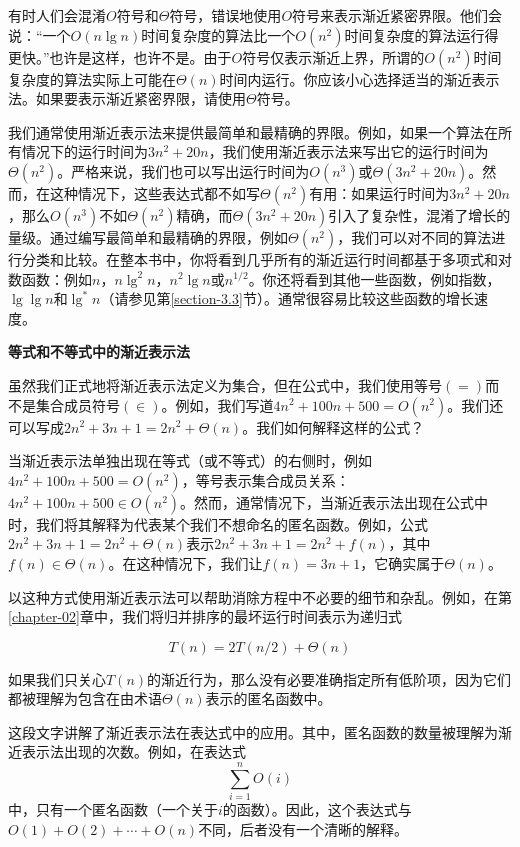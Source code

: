 \documentclass[lang=cn,newtx,10pt,scheme=chinese]{elegantbook}
\begin{document}
有时人们会混淆$O$符号和$\Theta$符号，错误地使用$O$符号来表示渐近紧密界限。他们会说：“一个$O(n\lg n)$时间复杂度的算法比一个$O\left(n^2\right)$时间复杂度的算法运行得更快。”也许是这样，也许不是。由于$O$符号仅表示渐近上界，所谓的$O\left(n^2\right)$时间复杂度的算法实际上可能在$\Theta(n)$时间内运行。你应该小心选择适当的渐近表示法。如果要表示渐近紧密界限，请使用$\Theta$符号。

我们通常使用渐近表示法来提供最简单和最精确的界限。例如，如果一个算法在所有情况下的运行时间为$3n^2+20n$，我们使用渐近表示法来写出它的运行时间为$\Theta\left(n^2\right)$。严格来说，我们也可以写出运行时间为$O\left(n^3\right)$或$\Theta\left(3n^2+20n\right)$。然而，在这种情况下，这些表达式都不如写$\Theta\left(n^2\right)$有用：如果运行时间为$3n^2+20n$，那么$O\left(n^3\right)$不如$\Theta\left(n^2\right)$精确，而$\Theta\left(3n^2+20n\right)$引入了复杂性，混淆了增长的量级。通过编写最简单和最精确的界限，例如$\Theta\left(n^2\right)$，我们可以对不同的算法进行分类和比较。在整本书中，你将看到几乎所有的渐近运行时间都基于多项式和对数函数：例如$n$，$n \lg ^2 n$，$n^2 \lg n$或$n^{1 / 2}$。你还将看到其他一些函数，例如指数，$\lg \lg n$和$\lg ^* n$（请参见第\ref{section-3.3}节）。通常很容易比较这些函数的增长速度。

\textbf{等式和不等式中的渐近表示法}

虽然我们正式地将渐近表示法定义为集合，但在公式中，我们使用等号$(=)$而不是集合成员符号$(\in)$。例如，我们写道$4n^2+100n+500=O\left(n^2\right)$。我们还可以写成$2n^2+3n+1=2n^2+\Theta(n)$。我们如何解释这样的公式？

当渐近表示法单独出现在等式（或不等式）的右侧时，例如$4n^2+100n+500=O\left(n^2\right)$，等号表示集合成员关系：$4n^2+100n+500 \in O\left(n^2\right)$。然而，通常情况下，当渐近表示法出现在公式中时，我们将其解释为代表某个我们不想命名的匿名函数。例如，公式$2n^2+3n+1=2n^2+\Theta(n)$表示$2n^2+3n+1=2n^2+f(n)$，其中$f(n) \in \Theta(n)$。在这种情况下，我们让$f(n)=3n+1$，它确实属于$\Theta(n)$。

以这种方式使用渐近表示法可以帮助消除方程中不必要的细节和杂乱。例如，在第\ref{chapter-02}章中，我们将归并排序的最坏运行时间表示为递归式

$$
T(n)=2 T(n / 2)+\Theta(n)
$$

如果我们只关心$T(n)$的渐近行为，那么没有必要准确指定所有低阶项，因为它们都被理解为包含在由术语$\Theta(n)$表示的匿名函数中。

这段文字讲解了渐近表示法在表达式中的应用。其中，匿名函数的数量被理解为渐近表示法出现的次数。例如，在表达式$$\sum_{i=1}^n O(i)$$中，只有一个匿名函数（一个关于$i$的函数）。因此，这个表达式与$O(1)+O(2)+\cdots+O(n)$不同，后者没有一个清晰的解释。
\end{document}

